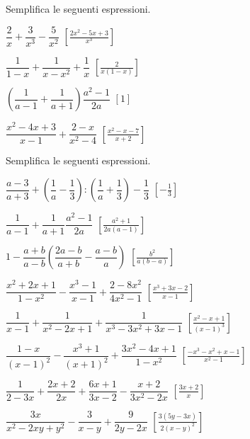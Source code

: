 \begin{esercizio}[\Ast]
\label{ese:19.31}
Semplifica le seguenti espressioni.
\begin{multicols}{2}
\begin{enumeratea}
 \item \(\dfrac{2}{x}+\dfrac{3}{x^{3}}-\dfrac{5}{x^{2}}\)
  \hfill \(\left[\frac{2x^{2}-5x+3}{x^{3}}\right]\)
 \item \(\dfrac{1}{1-x}+\dfrac{1}{x-x^{2}}+\dfrac{1}{x}\)
  \hfill \(\left[\frac{2}{x(1-x)}\right]\)
 \item \(\left(\dfrac{1}{a-1}+\dfrac{1}{a+1}\right)\dfrac{a^{2}-1}{2a}\)
  \hfill \(\left[1\right]\)
 \item \(\dfrac{x^{2}-4x+3}{x-1}+\dfrac{2-x}{x^{2}-4}\)
  \hfill \(\left[\frac{x^{2}-x-7}{x+2}\right]\)
\end{enumeratea}
\end{multicols}
\end{esercizio}

\begin{esercizio}[\Ast]
Semplifica le seguenti espressioni.
\begin{enumeratea}
 \item \(\dfrac{a-3}{a+3}+\left(\dfrac{1}{a}-\dfrac{1}{3}\right):
        \left(\dfrac{1}{a}+\dfrac{1}{3}\right)-\dfrac{1}{3}\)
  \hfill \(\left[-{\frac{1}{3}}\right]\)
 \item \(\dfrac{1}{a-1}+\dfrac{1}{a+1}\dfrac{a^{2}-1}{2a}\)
  \hfill \(\left[\frac{a^{2}+1}{2a(a-1)}\right]\)
 \item \(1-\dfrac{a+b}{a-b} \left(\dfrac{2a-b}{a+b}-\dfrac{a-b}{a}\right)\)
  \hfill \(\left[\frac{b^{2}}{a(b-a)}\right]\)
 \item \(\dfrac{x^{2}+2x+1}{1-x^{2}}-\dfrac{x^{3}-1}{x-1}+
        \dfrac{2-8x^{2}}{4x^{2}-1}\)
  \hfill \(\left[\frac{x^{3}+3x-2}{x-1}\right]\)
 \item \(\dfrac{1}{x-1}+\dfrac{1}{x^{2}-2x+1}+\dfrac{1}{x^{3}-3x^{2}+3x-1}\)
  \hfill \(\left[\frac{x^{2}-x+1}{(x-1)^{3}}\right]\)
 \item \(\dfrac{1-x}{(x-1)^{2}}-\dfrac{x^{3}+1}{(x+1)^{2}}+
        \dfrac{3x^{2}-4x+1}{1-x^{2}}\)
  \hfill \(\left[\frac{-x^{3}-x^{2}+x-1}{x^{2}-1}\right]\)
 \item \(\dfrac{1}{2-3x}+\dfrac{2x+2}{2x}+\dfrac{6x+1}{3x-2}-
        \dfrac{x+2}{3x^{2}-2x}\)
  \hfill \(\left[\frac{3x+2}{x}\right]\)
 \item \(\dfrac{3x}{x^{2}-2xy+y^{2}}-\dfrac{3}{x-y}+\dfrac{9}{2y-2x}\)
  \hfill \(\left[\frac{3(5y-3x)}{2(x-y)^{2}}\right]\)
\end{enumeratea}
\end{esercizio}

